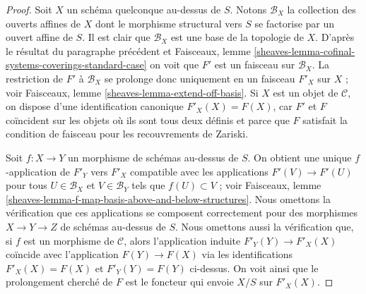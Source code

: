 \begin{proof}
\medskip\noindent
Soit $X$ un schéma quelconque au-dessus de $S$. Notons $\mathcal{B}_X$
la collection des ouverts affines de $X$ dont le morphisme structural
vers $S$ se factorise par un ouvert affine de $S$. Il est clair que
$\mathcal{B}_X$ est une base de la topologie de $X$.
D'après le résultat du paragraphe précédent et Faisceaux, lemme
\ref{sheaves-lemma-cofinal-systems-coverings-standard-case}
on voit que $F'$ est un faisceau sur $\mathcal{B}_X$.
La restriction de $F'$ à $\mathcal{B}_X$
se prolonge donc uniquement en un faisceau $F'_X$ sur $X$ ; voir
Faisceaux, lemme \ref{sheaves-lemma-extend-off-basis}.
Si $X$ est un objet de $\mathcal{C}$, on dispose d'une
identification canonique $F'_X(X) = F(X)$, car $F'$ et $F$ coïncident
sur les objets où ils sont tous deux définis et
parce que $F$ satisfait la condition de faisceau pour les
recouvrements de Zariski.

\medskip\noindent
Soit $f : X \to Y$ un morphisme de schémas au-dessus de $S$.
On obtient une unique $f$-application de $F'_Y$ vers $F'_X$ compatible
avec les applications $F'(V) \to F'(U)$ pour tous
$U \in \mathcal{B}_X$ et $V \in \mathcal{B}_Y$
tels que $f(U) \subset V$ ; voir
Faisceaux, lemme \ref{sheaves-lemma-f-map-basis-above-and-below-structures}.
Nous omettons la vérification que ces applications se composent
correctement pour des morphismes $X \to Y \to Z$ de schémas au-dessus de $S$.
Nous omettons aussi la vérification que, si $f$ est un morphisme
de $\mathcal{C}$, alors l'application induite $F'_Y(Y) \to F'_X(X)$
coïncide avec l'application $F(Y) \to F(X)$ via les identifications
$F'_X(X) = F(X)$ et $F'_Y(Y) = F(Y)$ ci-dessus.
On voit ainsi que le prolongement cherché de
$F$ est le foncteur qui envoie $X/S$ sur $F'_X(X)$.


\end{proof}
